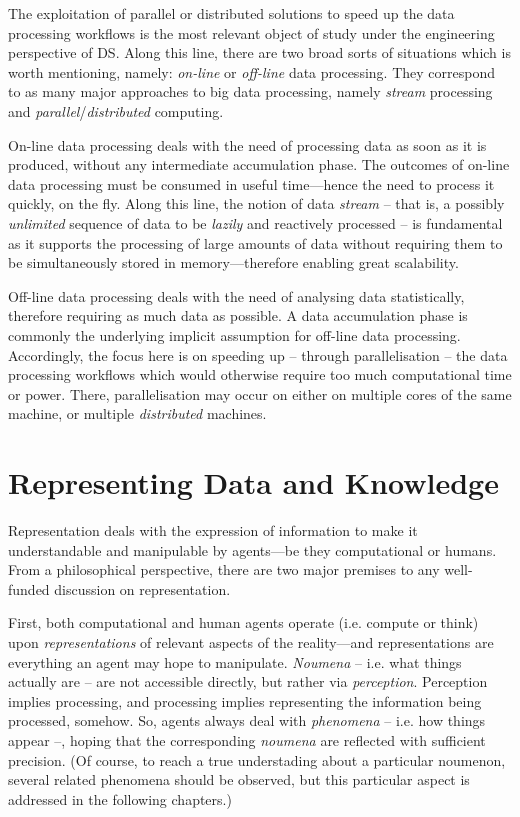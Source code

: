 \documentclass[12pt,a4paper,openright,twoside]{book}
\begin{document}
The exploitation of parallel or distributed solutions to speed up the data processing workflows is the most relevant object of study under the engineering perspective of DS.
%
Along this line, there are two broad sorts of situations which is worth mentioning, namely: \emph{on-line} or \emph{off-line} data processing.
%
They correspond to as many major approaches to big data processing, namely \emph{stream} processing and \emph{parallel}/\emph{distributed} computing.

On-line data processing deals with the need of processing data as soon as it is produced, without any intermediate accumulation phase.
%
The outcomes of on-line data processing must be consumed in useful time---hence the need to process it quickly, on the fly.
%
Along this line, the notion of data \emph{stream} -- that is, a possibly \emph{unlimited} sequence of data to be \emph{lazily} and reactively processed -- is fundamental as it supports the processing of large amounts of data without requiring them to be simultaneously stored in memory---therefore enabling great scalability.

Off-line data processing deals with the need of analysing data statistically, therefore requiring as much data as possible.
%
A data accumulation phase is commonly the underlying implicit assumption for off-line data processing.
%
Accordingly, the focus here is on speeding up -- through parallelisation -- the data processing workflows which would otherwise require too much computational time or power.
%
There, parallelisation may occur on either on multiple cores of the same machine, or multiple \emph{distributed} machines.

\chapter{Representing Data and Knowledge}

Representation deals with the expression of information to make it understandable and manipulable by agents---be they computational or humans.
%
From a philosophical perspective, there are two major premises to any well-funded discussion on representation.

First, both computational and human agents operate (i.e. compute or think) upon \emph{representations} of relevant aspects of the reality---and representations are everything an agent may hope to manipulate.
%
\emph{Noumena} -- i.e. what things actually are -- are not accessible directly, but rather via \emph{perception}.
%
Perception implies processing, and processing implies representing the information being processed, somehow.
%
So, agents always deal with \emph{phenomena} -- i.e. how things appear --, hoping that the corresponding \emph{noumena} are reflected with sufficient precision.
%
(Of course, to reach a true understading about a particular noumenon, several related phenomena should be observed, but this particular aspect is addressed in the following chapters.)
%
\end{document}
